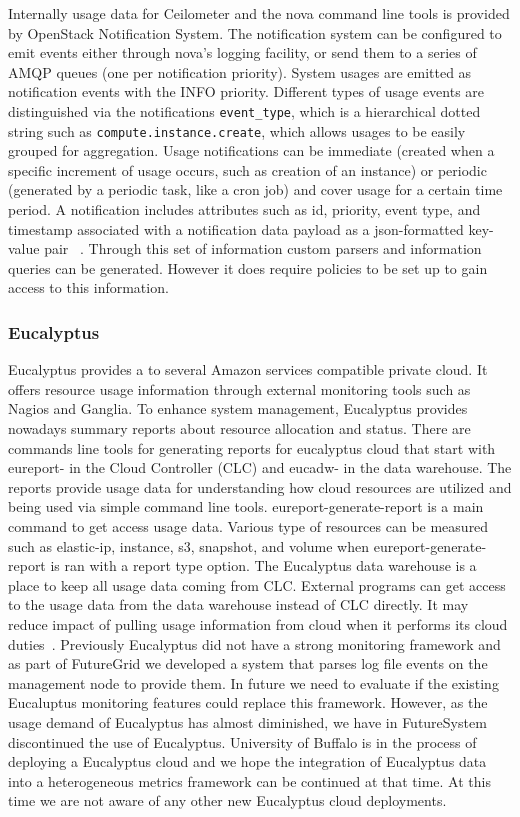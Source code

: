 \documentclass{sig-alternate-05-2015}
\begin{document}
Internally usage data for Ceilometer and the nova command line tools is provided by OpenStack Notification System. The notification system can be configured to emit events either through nova's logging facility, or send them to a series of AMQP queues (one per notification priority). System usages are emitted as notification events with the INFO priority. Different types of usage events are distinguished via the notifications \verb|event_type|, which is a hierarchical dotted string such as \verb|compute.instance.create|, which allows usages to be easily grouped for aggregation. Usage notifications can be immediate (created when a specific increment of usage occurs, such as creation of an instance) or periodic (generated by a periodic task, like a cron job) and cover usage for a certain time period. A notification includes attributes such as id, priority, event type, and timestamp associated with a notification data payload as a json-formatted key-value pair ~\cite{SystemUsageData}.  Through this set of information custom parsers and information queries can be generated. However it does require policies to be set up to gain access to this information.

\subsubsection{Eucalyptus}

Eucalyptus provides a to several Amazon services compatible private cloud.  It offers resource usage information through external monitoring tools such as Nagios and Ganglia.  To enhance system management, Eucalyptus provides nowadays summary reports about resource allocation and status. There are commands line tools for generating reports for eucalyptus cloud that start with eureport- in the Cloud Controller (CLC) and eucadw- in the data warehouse. The reports provide usage data for understanding how cloud resources are utilized and being used via simple command line tools. eureport-generate-report is a main command to get access usage data. Various type of resources can be measured such as elastic-ip, instance, s3, snapshot, and volume when eureport-generate-report is ran with a report type option. The Eucalyptus data warehouse is a place to keep all usage data coming from CLC. External programs can get access to the usage data from the data warehouse instead of CLC directly. It may reduce impact of pulling usage information from cloud when it performs its cloud duties~\cite{Euca2ools14}.  Previously Eucalyptus did not have a strong monitoring framework and as part of FutureGrid we developed a system that parses log file events on the management node to provide them. In future we need to evaluate if the existing Eucaluptus monitoring features could replace this framework. However, as the usage demand of Eucalyptus has almost diminished, we have in FutureSystem discontinued the use of Eucalyptus. University of Buffalo is in the process of deploying a Eucalyptus cloud and we hope the integration of Eucalyptus data into a heterogeneous metrics framework can be continued at that time. At this time we are not aware of any other new Eucalyptus cloud deployments.
\end{document}
